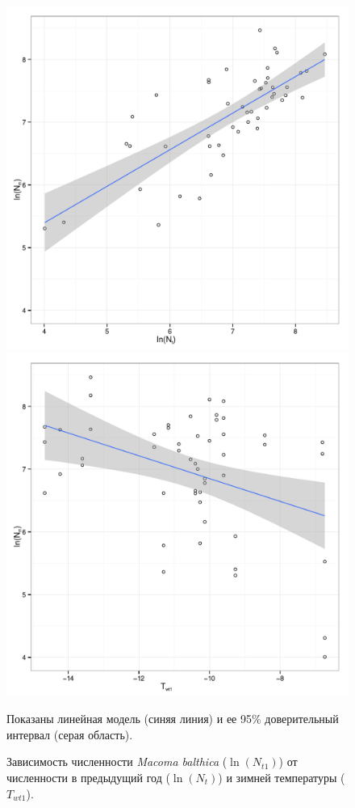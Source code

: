 	\begin{figure}[p]
		\includegraphics[height=0.4\textheight]{../article_Macoma_dynamic_White_sea/N_vs_temperature/lodNt_vs_logNt1_1.pdf}

		\includegraphics[height=0.4\textheight]{../article_Macoma_dynamic_White_sea/N_vs_temperature/Twt1_vs_logNt1_1.pdf}

	\caption{Зависимость численности  \textit{Macoma balthica} ($\ln(N_{t1})$) от численности в предыдущий год ($\ln(N_{t})$) и зимней температуры ($T_{wt1}$).}
	\label{ris:model_temperature}
	\footnotesize{Показаны линейная модель (синяя линия) и ее 95\% доверительный интервал (серая область).}
	\end{figure}

